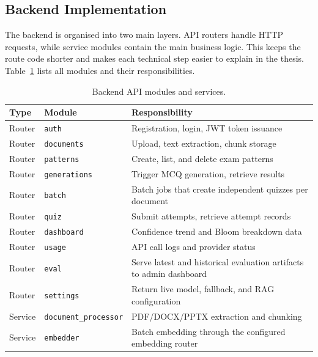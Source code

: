 \documentclass[12pt,a4paper]{article}
\begin{document}
\subsection{Backend Implementation}

The backend is organised into two main layers. API routers handle HTTP
requests, while service modules contain the main business logic. This keeps
the route code shorter and makes each technical step easier to explain in
the thesis. Table~\ref{tab:backend-modules} lists all modules and their
responsibilities.

\begin{table}[H]
  \centering
  \singlespacing
  \caption{Backend API modules and services.}
  \label{tab:backend-modules}
  \small
  \begin{tabular}{p{1.4cm}p{4.2cm}p{7.8cm}}
    \toprule
    \textbf{Type} & \textbf{Module} & \textbf{Responsibility} \\
    \midrule
    Router & \texttt{auth}                  & Registration, login, JWT token issuance \\
    Router & \texttt{documents}             & Upload, text extraction, chunk storage \\
    Router & \texttt{patterns}              & Create, list, and delete exam patterns \\
    Router & \texttt{generations}           & Trigger MCQ generation, retrieve results \\
    Router & \texttt{batch}                 & Batch jobs that create independent quizzes per document \\
    Router & \texttt{quiz}                  & Submit attempts, retrieve attempt records \\
    Router & \texttt{dashboard}             & Confidence trend and Bloom breakdown data \\
    Router & \texttt{usage}                 & API call logs and provider status \\
    Router & \texttt{eval}                  & Serve latest and historical evaluation artifacts to admin dashboard \\
    Router & \texttt{settings}              & Return live model, fallback, and RAG configuration \\
    \midrule
    Service & \texttt{document\_processor}  & PDF/DOCX/PPTX extraction and chunking \\
    Service & \texttt{embedder}             & Batch embedding through the configured embedding router \\

\end{tabular}
\end{table}
\end{document}
